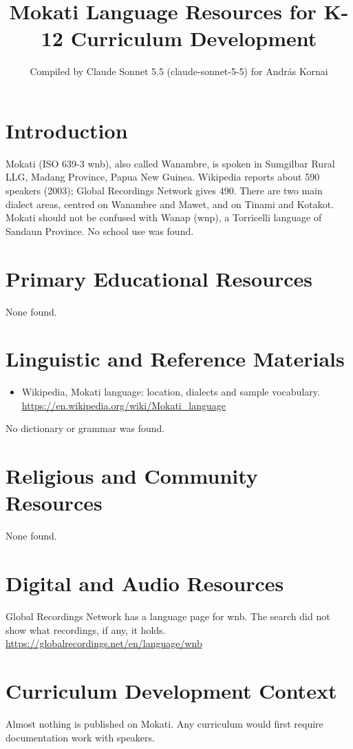 \documentclass[12pt]{article}
\title{Mokati Language Resources for K-12 Curriculum Development}
\author{Compiled by Claude Sonnet 5.5 (claude-sonnet-5-5) for Andr\'as Kornai}
\date{}
\begin{document}
\maketitle

\section{Introduction}
Mokati (ISO 639-3 wnb), also called Wanambre, is spoken in Sumgilbar Rural LLG, Madang Province, Papua New Guinea. Wikipedia reports about 590 speakers (2003); Global Recordings Network gives 490. There are two main dialect areas, centred on Wanambre and Mawet, and on Tinami and Kotakot. Mokati should not be confused with Wanap (wnp), a Torricelli language of Sandaun Province. No school use was found.

\section{Primary Educational Resources}
None found.

\section{Linguistic and Reference Materials}
\begin{itemize}
\item Wikipedia, Mokati language: location, dialects and sample vocabulary. \url{https://en.wikipedia.org/wiki/Mokati_language}
\end{itemize}
No dictionary or grammar was found.

\section{Religious and Community Resources}
None found.

\section{Digital and Audio Resources}
Global Recordings Network has a language page for wnb. The search did not show what recordings, if any, it holds. \url{https://globalrecordings.net/en/language/wnb}

\section{Curriculum Development Context}
Almost nothing is published on Mokati. Any curriculum would first require documentation work with speakers.
\end{document}
